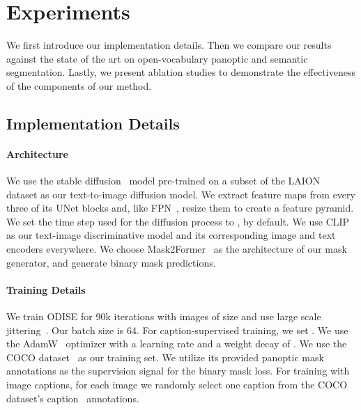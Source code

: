 \documentclass[10pt,twocolumn,letterpaper]{article}
\newcommand{\ourmethod}{ODISE}
\begin{document}
\section{Experiments}

We first introduce our implementation details. Then we compare our results against the state of the art on open-vocabulary panoptic and semantic segmentation.
Lastly, we present ablation studies to demonstrate the effectiveness of the components of our method.


\subsection{Implementation Details}

\paragraph{Architecture}
We use the stable diffusion~\cite{rombach2022ldm} model pre-trained on a subset of the LAION~\cite{schuhmann2021laion} dataset as our text-to-image diffusion model. 
We extract feature maps from every three of its UNet blocks and, like FPN~\cite{lin2017fpn}, resize them to create a feature pyramid.
We set the time step used for the diffusion process to , by default. 
We use CLIP~\cite{radford2021clip} as our text-image discriminative model and its corresponding image  and text  encoders everywhere. 
We choose Mask2Former~\cite{cheng2022mask2former} as the architecture of our mask generator, and generate  binary mask predictions.

\paragraph{Training Details}
We train \ourmethod{} for 90k iterations with images of size  and use large scale jittering~\cite{ghiasi2021simple}.
Our batch size is 64. 
For caption-supervised training, we set .
We use the AdamW~\cite{loshchilov2017decoupled} optimizer with a learning rate  and a weight decay of . 
We use the COCO dataset~\cite{lin2014coco} as our training set. 
We utilize its provided panoptic mask annotations as the supervision signal for the binary mask loss.
For training with image captions, for each image we randomly select one caption from the COCO dataset's caption~\cite{chen2015cococap} annotations. 
\end{document}
